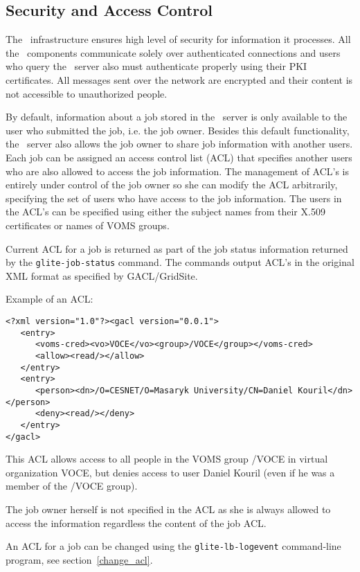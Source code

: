 \subsection{Security and Access Control}

The \LB\ infrastructure ensures high level of security for information it
processes. All the \LB\ components communicate solely over authenticated
connections and users who query the \LB\ server also must authenticate properly
using their PKI certificates. All messages sent over the network are encrypted
and their content is not accessible to unauthorized people.

By default, information about a job stored in the \LB\ server is only available
to the user who submitted the job, i.e. the job owner.  Besides this default
functionality, the \LB\ server also allows the job owner to share job
information with another users. Each job can be assigned an access control list
(ACL) that specifies another users who are also allowed to access the job
information. The management of ACL's is entirely under control of the job owner
so she can modify the ACL arbitrarily, specifying the set of users who have
access to the job information. The users in the ACL's can be specified using
either the subject names from their X.509 certificates or names of VOMS groups.

Current ACL for a job is returned as part of the job status information
returned by the \verb'glite-job-status' command. The commands output ACL's in
the original XML format as specified by GACL/GridSite. 

Example of an ACL:
\begin{verbatim}
<?xml version="1.0"?><gacl version="0.0.1">
   <entry>
      <voms-cred><vo>VOCE</vo><group>/VOCE</group></voms-cred>
      <allow><read/></allow>
   </entry>
   <entry>
      <person><dn>/O=CESNET/O=Masaryk University/CN=Daniel Kouril</dn></person>
      <deny><read/></deny>
   </entry>
</gacl>
\end{verbatim}

This ACL allows access to all people in the VOMS group /VOCE in virtual
organization VOCE, but denies access to user Daniel Kouril (even if he was a
member of the /VOCE group).

The job owner herself is not specified in the ACL as she is always allowed to
access the information regardless the content of the job ACL.

An ACL for a job can be changed using the \verb'glite-lb-logevent' command-line
program, see section~\ref{change_acl}.

%

\endinput
